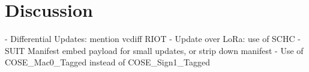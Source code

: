 \section{Discussion}
- Differential Updates: mention vcdiff RIOT
- Update over LoRa: use of SCHC
- SUIT Manifest embed payload for small updates, or strip down manifest
- Use of COSE\_Mac0\_Tagged instead of COSE\_Sign1\_Tagged
